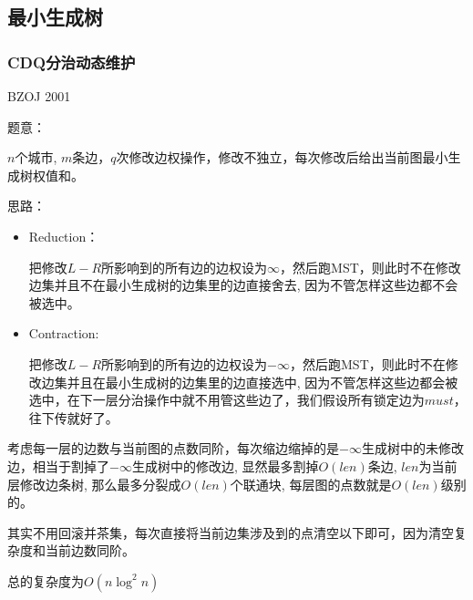 \subsection{最小生成树}

\subsubsection{CDQ分治动态维护}

BZOJ 2001\par
题意：\par
$n$个城市, $m$条边，$q$次修改边权操作，修改不独立，每次修改后给出当前图最小生成树权值和。\par

思路：\par

\begin{itemize}
\item Reduction：\par
把修改$L-R$所影响到的所有边的边权设为$\infty$，然后跑MST，则此时不在修改边集并且不在最小生成树的边集里的边直接舍去, 因为不管怎样这些边都不会被选中。

\item Contraction: \par
把修改$L-R$所影响到的所有边的边权设为$-\infty$，然后跑MST，则此时不在修改边集并且在最小生成树的边集里的边直接选中, 因为不管怎样这些边都会被选中，在下一层分治操作中就不用管这些边了，我们假设所有锁定边为$must$，往下传就好了。
\end{itemize}

考虑每一层的边数与当前图的点数同阶，每次缩边缩掉的是$-\infty$生成树中的未修改边，相当于割掉了$-\infty$生成树中的修改边, 显然最多割掉$O(len)$条边,
$len$为当前层修改边条树, 那么最多分裂成$O(len)$个联通块, 每层图的点数就是$O(len)$级别的。\par

其实不用回滚并茶集，每次直接将当前边集涉及到的点清空以下即可，因为清空复杂度和当前边数同阶。\par
总的复杂度为$O(n \log^2 n)$

